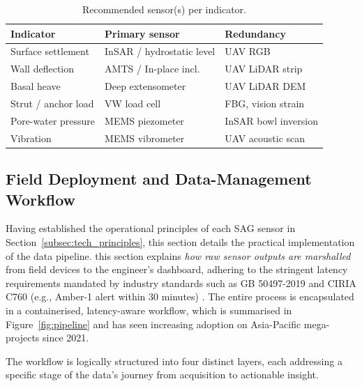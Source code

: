 \documentclass[preprint,11pt,authoryear,3p]{elsarticle}
\begin{document}
\begin{table}[htbp]
\centering\small
\caption{Recommended sensor(s) per indicator.}
\label{tab:mapping}
\begin{tabular}{@{}lll@{}}
\toprule
\textbf{Indicator} & \textbf{Primary sensor} & \textbf{Redundancy}\\
\midrule
Surface settlement & InSAR / hydrostatic level & UAV RGB \\
Wall deflection    & AMTS / In-place incl.     & UAV LiDAR strip \\
Basal heave        & Deep extensometer         & UAV LiDAR DEM \\
Strut / anchor load& VW load cell              & FBG, vision strain \\
Pore-water pressure& MEMS piezometer           & InSAR bowl inversion \\
Vibration          & MEMS vibrometer           & UAV acoustic scan \\
\bottomrule
\end{tabular}
\end{table}

\subsection{Field Deployment and Data-Management Workflow}
\label{subsec:workflow}

Having established the operational principles of each SAG sensor in Section~\ref{subsec:tech_principles}, this section details the practical implementation of the data pipeline. this section explains \emph{how raw sensor outputs are marshalled} from field devices to the engineer's dashboard, adhering to the stringent latency requirements mandated by industry standards such as GB 50497-2019 and CIRIA C760 (e.g., Amber-1 alert within 30 minutes) \citep{GB50497:2019,CIRIA760}. The entire process is encapsulated in a containerised, latency-aware workflow, which is summarised in Figure~\ref{fig:pipeline} and has seen increasing adoption on Asia-Pacific mega-projects since 2021.

The workflow is logically structured into four distinct layers, each addressing a specific stage of the data's journey from acquisition to actionable insight.

\end{document}
